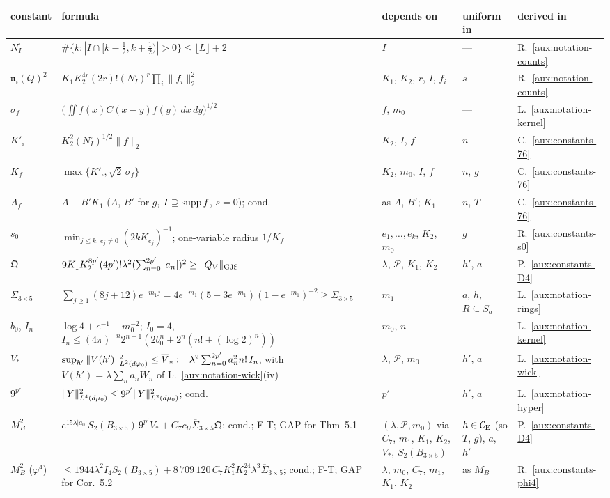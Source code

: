 \begin{center}
\footnotesize
\begin{tabular}{@{}p{}p{}p{}p{}p{}@{}}
\toprule
constant & formula & depends on & uniform in & derived in\\
\midrule
$N^{\square}_I$ & $\#\{k:|I\cap[k-\frac12,k+\frac12)|>0\}\le\lfloor L\rfloor+2$ & $I$ & --- &
R.~\ref{aux:notation-counts}\\
$\mathfrak n_\square(Q)^2$ & $K_1K_2^{4r}(2r)!(N^{\square}_I)^r\prod_i\|f_i\|_2^2$ &
$K_1$, $K_2$, $r$, $I$, $f_i$ & $s$ & R.~\ref{aux:notation-counts}\\
$\sigma_f$ & $\bigl(\iint f(x)C(x-y)f(y)\,dx\,dy\bigr)^{1/2}$ & $f$, $m_0$ & --- &
L.~\ref{aux:notation-kernel}\\
$K'_\square$ & $K_2^2(N^{\square}_I)^{1/2}\|f\|_2$ & $K_2$, $I$, $f$ & $n$ & C.~\ref{aux:constants-76}\\
$K_f$ & $\max\{K'_\square,\sqrt2\,\sigma_f\}$ & $K_2$, $m_0$, $I$, $f$ & $n$, $g$ &
C.~\ref{aux:constants-76}\\
$A_f$ & $A+B'K_1$ ($A$, $B'$ for $g$, $I\supseteq\operatorname{supp} f$, $s=0$); cond. & as $A$, $B'$;
$K_1$ & $n$, $T$ & C.~\ref{aux:constants-76}\\
$s_0$ & $\min_{j\le k,\,e_j\ne0}(2kK_{e_j})^{-1}$; one-variable radius $1/K_f$ & $e_1,\dots,e_k$,
$K_2$, $m_0$ & $g$ & R.~\ref{aux:constants-s0}\\
$\mathfrak Q$ & $9K_1K_2^{8p'}(4p')!\lambda^2(\sum_{n=0}^{2p'}|a_n|)^2\ge\lVert Q_V\rVert_{\mathrm{GJS}}$ &
$\lambda$, $\mathscr P$, $K_1$, $K_2$ & $h'$, $a$ & P.~\ref{aux:constants-D4}\\
$\overline\Sigma_{3\times5}$ & $\sum_{j\ge1}(8j+12)e^{-m_1j}=4e^{-m_1}(5-3e^{-m_1})
(1-e^{-m_1})^{-2}\ge\Sigma_{3\times5}$ & $m_1$ & $a$, $h$, $R\subseteq S_a$ &
L.~\ref{aux:notation-rings}\\
$b_0$, $I_n$ & $\log4+e^{-1}+m_0^{-2}$; $I_0=4$,
$I_n\le(4\pi)^{-n}2^{n+1}(2b_0^n+2^n(n!+(\log2)^n))$ & $m_0$, $n$ & --- &
L.~\ref{aux:notation-kernel}\\
$V_*$ & $\sup_{h'}\|V(h')\|^2_{L^2(d\varphi_0)}\le\overline V_*:=\lambda^2\sum_{n=0}^{2p'}a_n^2n!\,I_n$,
with $V(h')=\lambda\sum_na_nW_n$ of L.~\ref{aux:notation-wick}(iv)
& $\lambda$, $\mathscr P$, $m_0$ & $h'$, $a$ & L.~\ref{aux:notation-wick}\\
$9^{p'}$ & $\|Y\|_{L^4(d\mu_0)}^2\le9^{p'}\|Y\|_{L^2(d\mu_0)}^2$; cond. & $p'$ & $h'$, $a$ &
L.~\ref{aux:notation-hyper}\\
$M_B^2$ & $e^{15\lambda|a_0|}S_2(B_{3\times5})\,9^{p'}V_*+C_7c_U\overline\Sigma_{3\times5}\mathfrak Q$;
cond.; F-T; GAP for Thm~5.1 & $(\lambda,\mathscr P,m_0)$ via $C_7$, $m_1$, $K_1$, $K_2$, $V_*$, $S_2(B_{3\times5})$ &
$h\in\mathcal{C}_{\mathrm E}$ (so $T$, $g$), $a$, $h'$ & P.~\ref{aux:constants-D4}\\
$M_B^2$ ($\varphi^4$) & $\le1944\lambda^2I_4S_2(B_{3\times5})+8\,709\,120\,C_7K_1^2K_2^{24}
\lambda^3\overline\Sigma_{3\times5}$; cond.; F-T; GAP for Cor.~5.2 & $\lambda$, $m_0$, $C_7$, $m_1$, $K_1$, $K_2$ & as $M_B$ &
R.~\ref{aux:constants-phi4}\\
\bottomrule
\end{tabular}
\end{center}

